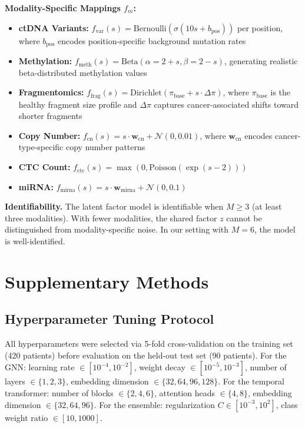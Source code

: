 \documentclass[10pt,a4paper]{article}
\begin{document}
\textbf{Modality-Specific Mappings $f_m$:}
\begin{itemize}
\item \textbf{ctDNA Variants:} $f_{\text{var}}(s) = \text{Bernoulli}(\sigma(10s + b_{\text{pos}}))$ per position, where $b_{\text{pos}}$ encodes position-specific background mutation rates
\item \textbf{Methylation:} $f_{\text{meth}}(s) = \text{Beta}(\alpha = 2 + s, \beta = 2 - s)$, generating realistic beta-distributed methylation values
\item \textbf{Fragmentomics:} $f_{\text{frag}}(s) = \text{Dirichlet}(\pi_{\text{base}} + s \cdot \Delta\pi)$, where $\pi_{\text{base}}$ is the healthy fragment size profile and $\Delta\pi$ captures cancer-associated shifts toward shorter fragments
\item \textbf{Copy Number:} $f_{\text{cn}}(s) = s \cdot \mathbf{w}_{\text{cn}} + \mathcal{N}(0, 0.01)$, where $\mathbf{w}_{\text{cn}}$ encodes cancer-type-specific copy number patterns
\item \textbf{CTC Count:} $f_{\text{ctc}}(s) = \max(0, \text{Poisson}(\exp(s - 2)))$
\item \textbf{miRNA:} $f_{\text{mirna}}(s) = s \cdot \mathbf{w}_{\text{mirna}} + \mathcal{N}(0, 0.1)$
\end{itemize}

\textbf{Identifiability.} The latent factor model is identifiable when $M \geq 3$ (at least three modalities). With fewer modalities, the shared factor $z$ cannot be distinguished from modality-specific noise. In our setting with $M = 6$, the model is well-identified.

\newpage

\section{Supplementary Methods}

\subsection{Hyperparameter Tuning Protocol}

All hyperparameters were selected via 5-fold cross-validation on the training set (420 patients) before evaluation on the held-out test set (90 patients). For the GNN: learning rate $\in [10^{-4}, 10^{-2}]$, weight decay $\in [10^{-5}, 10^{-3}]$, number of layers $\in \{1, 2, 3\}$, embedding dimension $\in \{32, 64, 96, 128\}$. For the temporal transformer: number of blocks $\in \{2, 4, 6\}$, attention heads $\in \{4, 8\}$, embedding dimension $\in \{32, 64, 96\}$. For the ensemble: regularization $C \in [10^{-3}, 10^{2}]$, class weight ratio $\in [10, 1000]$.
\end{document}

